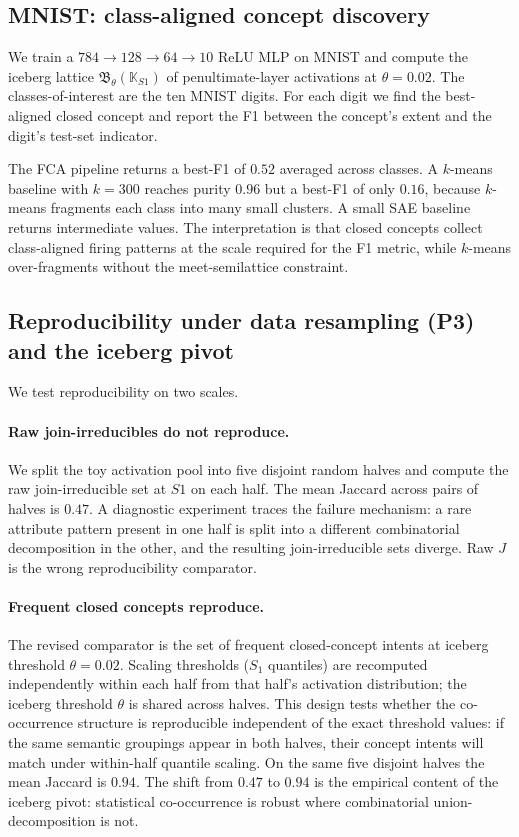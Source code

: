 \documentclass[a4paper,fleqn]{cas-dc}
\newcommand{\K}{\mathbb{K}}
\newcommand{\Lat}{\mathfrak{B}}
\newcommand{\Jirr}{J}
\begin{document}
\subsection{MNIST: class-aligned concept discovery}\label{ssec:mnist}

We train a $784 \to 128 \to 64 \to 10$ ReLU MLP on MNIST and compute the iceberg lattice $\Lat_\theta(\K_{S1})$ of penultimate-layer activations at $\theta = 0.02$.
The classes-of-interest are the ten MNIST digits.
For each digit we find the best-aligned closed concept and report the F1 between the concept's extent and the digit's test-set indicator.

The FCA pipeline returns a best-F1 of $0.52$ averaged across classes.
A $k$-means baseline with $k = 300$ reaches purity $0.96$ but a best-F1 of only $0.16$, because $k$-means fragments each class into many small clusters.
A small SAE baseline returns intermediate values.
The interpretation is that closed concepts collect class-aligned firing patterns at the scale required for the F1 metric, while $k$-means over-fragments without the meet-semilattice constraint.

\subsection{Reproducibility under data resampling (P3) and the iceberg pivot}\label{ssec:reproducibility}

We test reproducibility on two scales.

\paragraph{Raw join-irreducibles do not reproduce.}
We split the toy activation pool into five disjoint random halves and compute the raw join-irreducible set at $S1$ on each half.
The mean Jaccard across pairs of halves is $0.47$.
A diagnostic experiment traces the failure mechanism: a rare attribute pattern present in one half is split into a different combinatorial decomposition in the other, and the resulting join-irreducible sets diverge.
Raw $\Jirr$ is the wrong reproducibility comparator.

\paragraph{Frequent closed concepts reproduce.}
The revised comparator is the set of frequent closed-concept intents at iceberg threshold $\theta = 0.02$.
Scaling thresholds ($S_1$ quantiles) are recomputed independently within each half from that half's activation distribution; the iceberg threshold $\theta$ is shared across halves.
This design tests whether the co-occurrence structure is reproducible independent of the exact threshold values: if the same semantic groupings appear in both halves, their concept intents will match under within-half quantile scaling.
On the same five disjoint halves the mean Jaccard is $0.94$.
The shift from $0.47$ to $0.94$ is the empirical content of the iceberg pivot: statistical co-occurrence is robust where combinatorial union-decomposition is not.
\end{document}
